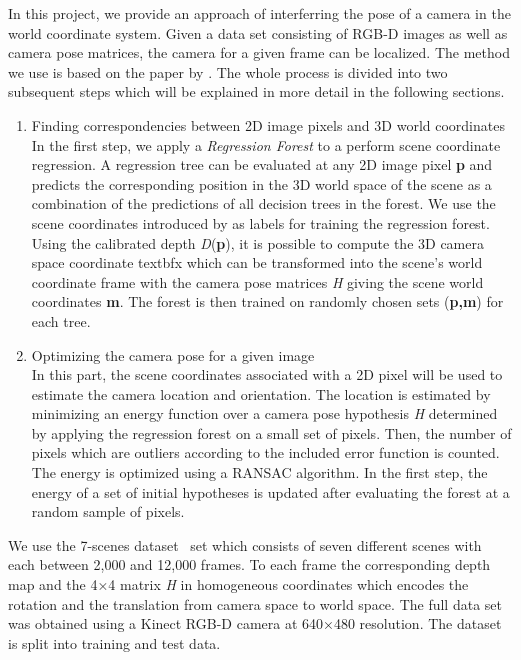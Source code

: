 \documentclass[final]{cvpr}
\begin{document}
In this project, we provide an approach of interferring the pose of a camera in the world coordinate system. 
Given a data set consisting of RGB-D images as well as camera pose matrices, the camera for a given frame can 
be localized. The method we use is based on the paper by \cite{shotton2013}.  The whole process is divided into 
two subsequent steps which will be explained in more detail in the following sections.
\begin{enumerate}
\item Finding correspondencies between 2D image pixels and 3D world coordinates  \\

In the first step, we apply a \textit{Regression Forest} to a perform scene coordinate regression. 
A regression tree can be evaluated at any 2D image pixel \textbf{p} and predicts the corresponding position 
in the 3D world space of the scene as a combination of the predictions of all decision trees in the forest. 
We use the scene coordinates introduced by \cite{shotton2013} as labels for training the regression forest. 
Using the calibrated depth \textit{D}(\textbf{p}), it is possible to compute the 3D camera space coordinate 
textbf{x} which can be transformed into the scene's world coordinate frame with the camera pose matrices \textit{H}
 giving  the scene world coordinates \textbf{m}. The forest is then trained on randomly chosen sets (\textbf{p,m})
  for each tree.

\item Optimizing the camera pose for a given image \\
In this part, the scene coordinates associated with a 2D pixel will be used to estimate the camera location and
 orientation. The location is estimated by minimizing an energy function over a camera pose hypothesis \textit{H} 
 determined by applying the regression forest on a small set of pixels. Then, the number of pixels which are 
 outliers according to the included error function is counted. The energy is optimized using a RANSAC algorithm.
  In the first step, the energy of a set of initial hypotheses is updated after evaluating the forest at a random 
  sample of pixels.
\end{enumerate}
    
    


We use the 7-scenes dataset~\cite{glocker2013} set which consists of seven different scenes with each between 
2,000 and 12,000 frames. To each frame the corresponding depth map and the 4×4 matrix \textit{H} in homogeneous 
coordinates which encodes the rotation and the translation from camera space to world space. The full data set 
was obtained using a Kinect RGB-D camera at 640×480 resolution. The dataset is split into training and test data.
\end{document}
